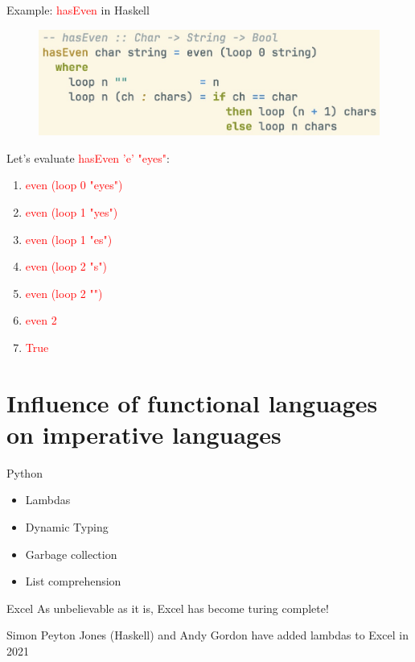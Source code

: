 \documentclass[pdf]{beamer}
\newcommand{\code}[1]{\textcolor{Red}{\textsf{#1}}}
\begin{document}
\begin{frame}{Example: \code{hasEven} in Haskell}
    \begin{figure}[H]
    \centering
    \includegraphics[width=0.80\linewidth]{hasEven-hs}
  \end{figure}

  \pause
  Let's evaluate \code{hasEven 'e' "eyes"}:

  \begin{enumerate}
    \item<1-> \code{even (loop 0 "eyes")}
    \item<2-> \code{even (loop 1 "yes")}
    \item<3-> \code{even (loop 1 "es")}
    \item<4-> \code{even (loop 2 "s")}
    \item<5-> \code{even (loop 2 "")}
    \item<6-> \code{even 2}
    \item<7-> \code{True}
  \end{enumerate}

\end{frame}

\section{Influence of functional languages on imperative languages}
\label{sec:influence}

\begin{frame}{Python}
  \begin{itemize}
  \item Lambdas
  \item Dynamic Typing
  \item Garbage collection
  \item List comprehension
  \end{itemize}
\end{frame}

\begin{frame}{Excel}
  As unbelievable as it is, Excel has become turing complete!

  Simon Peyton Jones (Haskell) and Andy Gordon have added lambdas to Excel in 2021
\end{frame}
\end{document}
